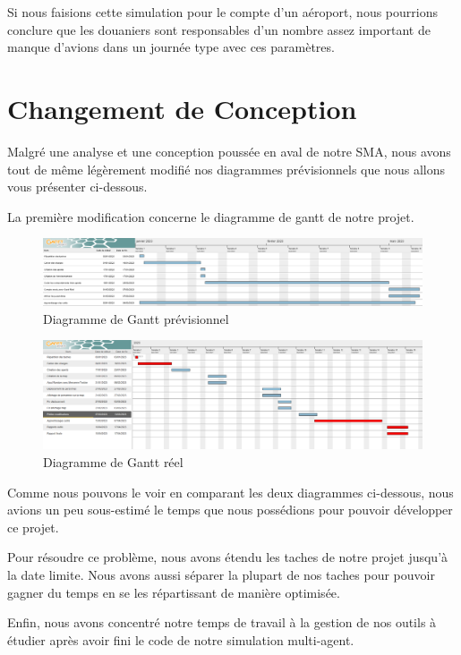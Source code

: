 \documentclass[12pt,french]{article} %
\begin{document}
\medskip

Si nous faisions cette simulation pour le compte d'un aéroport, nous pourrions conclure que les douaniers sont responsables d'un nombre assez important de manque d'avions dans un journée type avec ces paramètres.  

\section{Changement de Conception}

Malgré une analyse et une conception poussée en aval de notre SMA, nous avons tout de même légèrement modifié nos diagrammes prévisionnels que nous allons vous présenter ci-dessous.
\newline

La première modification concerne le diagramme de gantt de notre projet.

\begin{figure}[H]
	\centering
	\includegraphics[scale=0.35]{gantt.png}
	\caption{Diagramme de Gantt prévisionnel}    
\end{figure}

\begin{figure}[H]
	\centering
	\includegraphics[scale=0.285]{ganntreel.png}
	\caption{Diagramme de Gantt réel}   
\end{figure}
 
 Comme nous pouvons le voir en comparant les deux diagrammes ci-dessous, nous avions un peu sous-estimé le temps que nous possédions pour pouvoir développer ce projet. 
 
 Pour résoudre ce problème, nous avons étendu les taches de notre projet jusqu'à la date limite. Nous avons aussi séparer la plupart de nos taches pour pouvoir gagner du temps en se les répartissant de manière optimisée. 
 
 Enfin, nous avons concentré notre temps de travail à la gestion de nos outils à étudier après avoir fini le code de notre simulation multi-agent.
 
\end{document}
